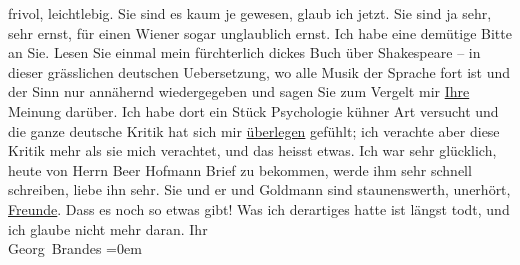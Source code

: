 \begin{ledgroupsized}[t]{13cm}
               frivol, leichtlebig. Sie sind es kaum je gewesen, glaub ich jetzt. Sie sind ja sehr,
               sehr ernst, für einen Wiener sogar unglaublich
               ernst.\pend
           \pstart
           Ich habe eine demütige Bitte an Sie. Lesen Sie einmal mein fürchterlich dickes Buch über Shakespeare – in dieser grässlichen deutschen Uebersetzung, wo
               alle Musik der Sprache fort ist und der Sinn nur annähernd wiedergegeben und sagen
               Sie zum Vergelt mir \uline{Ihre} Meinung darüber. Ich habe
               dort ein Stück Psychologie kühner Art versucht und die ganze deutsche Kritik hat sich
               mir \uline{überlegen} gefühlt; ich verachte aber diese Kritik
               mehr als sie mich verachtet, und das heisst etwas.\pend
           \pstart
           Ich war sehr glücklich, heute von Herrn Beer
                  Hofmann Brief zu bekommen, werde ihm sehr schnell schreiben, liebe ihn sehr.
               Sie und er und Goldmann sind staunenswerth,
               unerhört, \uline{Freunde}. Dass es noch so etwas gibt! Was
               ich derartiges hatte ist längst todt, und ich glaube nicht mehr daran.\pend
           \pstart
           Ihr{\\[\baselineskip]}\spacefill\mbox{Georg Brandes}\pend
           \leftskip=0em{}
         
         \endnumbering{}\end{ledgroupsized}  \newcommand{\dateiname}{L00639}\newcommand{\titel}{Georg Brandes an Arthur Schnitzler, 16. 1. 1897}\newcommand{\editorInnen}{Martin Anton Müller und Gerd-Hermann Susen}
      